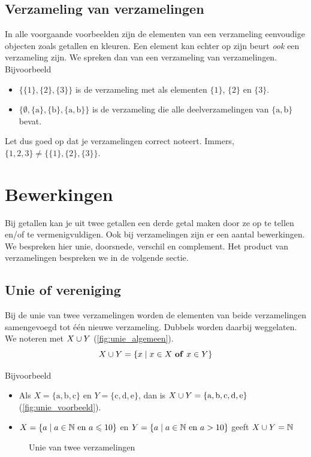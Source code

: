 \subsection{Verzameling van verzamelingen}
In alle voorgaande voorbeelden zijn de elementen van een verzameling eenvoudige objecten zoals getallen en kleuren. Een element kan echter op zijn beurt \emph{ook} een verzameling zijn. We spreken dan van een verzameling van verzamelingen. Bijvoorbeeld
\begin{itemize}
  \item $\{\{1\},\{2\},\{3\} \}$ is de verzameling met als elementen $\{1\}$, $\{2\}$ en $\{3\}$.
  \item $\{ \emptyset, \{\mathrm{a}\}, \{\mathrm{b}\}, \{\mathrm{a},\mathrm{b}\}\}$ is de verzameling die alle deelverzamelingen van $\{ \mathrm{a},\mathrm{b}\}$ bevat.
\end{itemize}
Let dus goed op dat je verzamelingen correct noteert. 
Immers,\\ $\{1,2,3 \}\not = \{\{ 1\},\{2 \},\{3 \} \}$.



\newpage
\section{Bewerkingen}
Bij getallen kan je  uit twee getallen een derde getal maken door ze  op te tellen en/of te  vermenigvuldigen. Ook bij verzamelingen zijn er een aantal bewerkingen. We bespreken hier unie, doorsnede, verschil en complement. Het product van verzamelingen bespreken we in de volgende sectie.

\subsection{Unie of vereniging}\index{\ensuremath{\union}}
Bij de unie van twee verzamelingen worden de elementen van beide verzamelingen samengevoegd tot \'e\'en nieuwe verzameling. Dubbels worden daarbij weggelaten. We noteren met $X \cup Y$ (\cref{fig:unie_algemeen}). 
\begin{equation*}
X \cup Y =\{x \mid x\in X ~\mathbf{of}~x\in Y \}
\end{equation*}

Bijvoorbeeld
\begin{itemize}
\item Als $X=\{\mathrm{a},\mathrm{b},\mathrm{c}\}$ en $Y=\{\mathrm{c},\mathrm{d},\mathrm{e}\}$, dan is $X\cup Y=\{\mathrm{a},\mathrm{b},\mathrm{c},\mathrm{d},\mathrm{e}\}$ (\cref{fig:unie_voorbeeld}).
\item $X=\{a \mid a\in \mathbb{N} ~\mathrm{en}~a\leqslant 10\}$ en $Y=\{a \mid a\in \mathbb{N} ~\mathrm{en}~a>10\}$ geeft $X\cup Y=\mathbb{N}$
\end{itemize}
\begin{figure}[htbp]
\centering
{}\qquad
{}
\caption{Unie van twee verzamelingen}
\end{figure}


